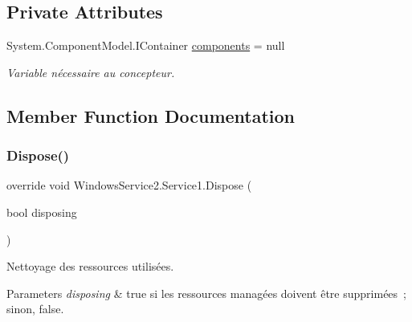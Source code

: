 \subsection*{Private Attributes}
\begin{DoxyCompactItemize}
\item 
System.\+Component\+Model.\+I\+Container \mbox{\hyperlink{class_windows_service2_1_1_service1_ab01ecad17e7152bd796777c9100d2e3a}{components}} = null
\begin{DoxyCompactList}\small\item\em Variable nécessaire au concepteur. \end{DoxyCompactList}\end{DoxyCompactItemize}


\subsection{Member Function Documentation}
\mbox{\label{class_windows_service2_1_1_service1_a35d81f8e347bf414b8163f34fd9d9796}} 
\subsubsection{\texorpdfstring{Dispose()}{Dispose()}}
{\footnotesize\ttfamily override void Windows\+Service2.\+Service1.\+Dispose (\begin{DoxyParamCaption}\item[{bool}]{disposing }\end{DoxyParamCaption})\hspace{0.3cm}{\ttfamily [protected]}}



Nettoyage des ressources utilisées. 


\begin{DoxyParams}{Parameters}
{\em disposing} & true si les ressources managées doivent être supprimées ; sinon, false.\\
\hline
\end{DoxyParams}
\mbox{\label{class_windows_service2_1_1_service1_a7fde76cfc3883fd1d5c2ef3dad7c1038}} 
